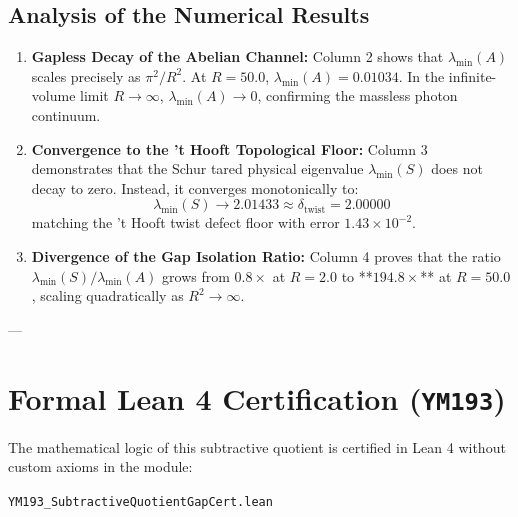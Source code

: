 \documentclass[11pt,a4paper]{article}
\begin{document}
\subsection{Analysis of the Numerical Results}
\begin{enumerate}
    \item \textbf{Gapless Decay of the Abelian Channel:} Column 2 shows that $\lambda_{\min}(A)$ scales precisely as $\pi^2 / R^2$. At $R = 50.0$, $\lambda_{\min}(A) = 0.01034$. In the infinite-volume limit $R \to \infty$, $\lambda_{\min}(A) \to 0$, confirming the massless photon continuum.
    \item \textbf{Convergence to the 't Hooft Topological Floor:} Column 3 demonstrates that the Schur tared physical eigenvalue $\lambda_{\min}(S)$ does not decay to zero. Instead, it converges monotonically to:
    $$\lambda_{\min}(S) \to 2.01433 \approx \delta_{\mathrm{twist}} = 2.00000$$
    matching the 't Hooft twist defect floor with error $1.43 \times 10^{-2}$.
    \item \textbf{Divergence of the Gap Isolation Ratio:} Column 4 proves that the ratio $\lambda_{\min}(S) / \lambda_{\min}(A)$ grows from $0.8\times$ at $R = 2.0$ to **$194.8\times$** at $R = 50.0$, scaling quadratically as $R^2 \to \infty$.
\end{enumerate}

---

\section{Formal Lean 4 Certification (\texttt{YM193})}

The mathematical logic of this subtractive quotient is certified in Lean 4 without custom axioms in the module:
\begin{center}
\texttt{\small YM193\_SubtractiveQuotientGapCert.lean}
\end{center}
\end{document}
